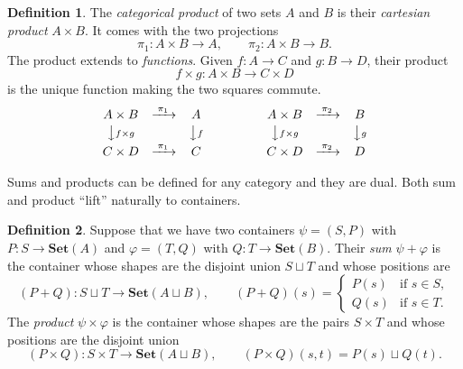 \documentclass[11pt, a4paper]{article}
\theoremstyle{definition}
\newtheorem{definition}{Definition}[section]
\theoremstyle{plain}
\begin{document}
\medskip

\noindent\colorbox{gray!15}{\parbox{\dimexpr\linewidth-2\fboxsep}{%
\begin{definition}\label{def:product-functions}
The \emph{categorical product} of two sets $A$ and $B$ is
their \emph{cartesian product} $A \times B$.  It comes
with the two projections
\[
  \pi_1 : A \times B \to A,
  \qquad
  \pi_2 : A \times B \to B.
\]
The product extends to \emph{functions}.  Given $f : A \to C$ and
$g : B \to D$, their product
\[
  f \times g : A \times B \to C \times D
\]
is
the unique function making the two squares commute.
\[
\begin{array}{ccc}
  A \times B & \xrightarrow{\;\pi_1\;} & A\\[2pt]
  \big\downarrow{\scriptstyle f \times g} & & \big\downarrow{\scriptstyle f}\\[2pt]
  C \times D & \xrightarrow{\;\pi_1\;} & C
\end{array}
\qquad\qquad
\begin{array}{ccc}
  A \times B & \xrightarrow{\;\pi_2\;} & B\\[2pt]
  \big\downarrow{\scriptstyle f \times g} & & \big\downarrow{\scriptstyle g}\\[2pt]
  C \times D & \xrightarrow{\;\pi_2\;} & D
\end{array}
\]
\end{definition}%
}}

\medskip
\noindent
Sums and products can be defined for any category and they are
dual.  Both sum and product ``lift'' naturally to containers.

\medskip
\noindent\colorbox{gray!15}{\parbox{\dimexpr\linewidth-2\fboxsep}{%
\begin{definition}\label{def:sum}
Suppose that we have two containers $\psi = (S, P)$ with
$P : S \to \mathbf{Set}(A)$ and $\varphi = (T, Q)$ with
$Q : T \to \mathbf{Set}(B)$.  Their \emph{sum}
$\psi + \varphi$ is the container whose shapes are the disjoint union
$S \sqcup T$ and whose positions are
\[
  (P + Q) : S \sqcup T \to \mathbf{Set}(A \sqcup B), \qquad
  (P + Q)(s) =
  \begin{cases}
    P(s) & \text{if } s \in S,\\
    Q(s) & \text{if } s \in T.
  \end{cases}
\]
The \emph{product} $\psi \times \varphi$ is the container whose
shapes are the pairs $S \times T$ and whose positions are the
disjoint union
\[
  (P \times Q) : S \times T \to \mathbf{Set}(A \sqcup B),
  \qquad
  (P \times Q)(s, t) = P(s) \sqcup Q(t).
\]
\end{definition}%
}}
\end{document}
